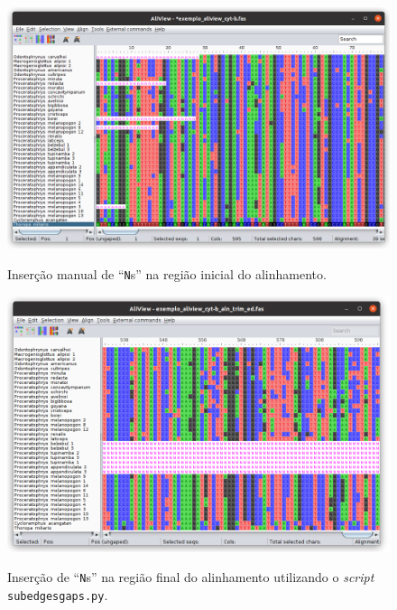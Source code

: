 \begin{refsection}
  \begin{figure}[H]
       \centering
      {\includegraphics[scale=0.4]{figures/tut7/aliview_05.png}}
	{\caption[AliView: edição da região inicial]{Inserção manual de ``\texttt{N}s'' na região inicial do alinhamento.}\label{tut7:fig:AliView_init}}
  \end{figure}

  \begin{figure}[H]
       \centering
      {\includegraphics[scale=0.4]{figures/tut7/aliview_06.png}}
	{\caption[AliView: edição da região final]{Inserção de ``\texttt{N}s'' na região final do alinhamento utilizando o \textit{script} \texttt{subedgesgaps.py}.}\label{tut7:fig:AliView_end}}
  \end{figure}


\end{refsection}

